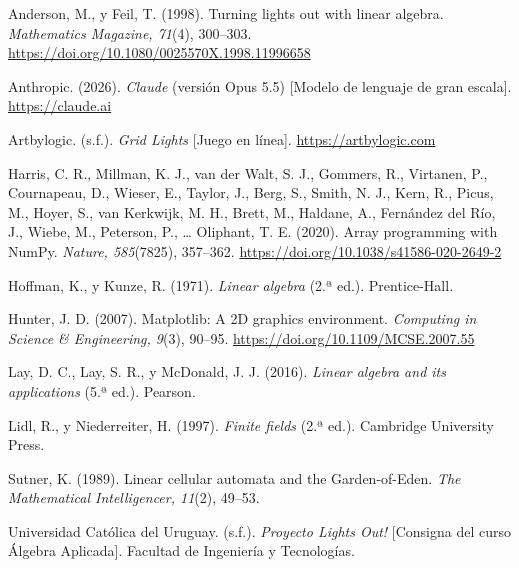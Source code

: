 \documentclass[12pt,a4paper]{article}
\theoremstyle{plain}
\theoremstyle{definition}
\theoremstyle{remark}
\begin{document}
\begingroup
\setlength{\parindent}{-1.27cm}
\setlength{\leftskip}{1.27cm}
\setlength{\parskip}{0.5em}

Anderson, M., y Feil, T. (1998). Turning lights out with linear algebra. \textit{Mathematics Magazine, 71}(4), 300--303. \url{https://doi.org/10.1080/0025570X.1998.11996658}

Anthropic. (2026). \textit{Claude} (versión Opus 5.5) [Modelo de lenguaje de gran escala]. \url{https://claude.ai}

Artbylogic. (s.f.). \textit{Grid Lights} [Juego en línea]. \url{https://artbylogic.com}

Harris, C. R., Millman, K. J., van der Walt, S. J., Gommers, R., Virtanen, P., Cournapeau, D., Wieser, E., Taylor, J., Berg, S., Smith, N. J., Kern, R., Picus, M., Hoyer, S., van Kerkwijk, M. H., Brett, M., Haldane, A., Fernández del Río, J., Wiebe, M., Peterson, P., \ldots{} Oliphant, T. E. (2020). Array programming with NumPy. \textit{Nature, 585}(7825), 357--362. \url{https://doi.org/10.1038/s41586-020-2649-2}

Hoffman, K., y Kunze, R. (1971). \textit{Linear algebra} (2.ª ed.). Prentice-Hall.

Hunter, J. D. (2007). Matplotlib: A 2D graphics environment. \textit{Computing in Science \& Engineering, 9}(3), 90--95. \url{https://doi.org/10.1109/MCSE.2007.55}

Lay, D. C., Lay, S. R., y McDonald, J. J. (2016). \textit{Linear algebra and its applications} (5.ª ed.). Pearson.

Lidl, R., y Niederreiter, H. (1997). \textit{Finite fields} (2.ª ed.). Cambridge University Press.

Sutner, K. (1989). Linear cellular automata and the Garden-of-Eden. \textit{The Mathematical Intelligencer, 11}(2), 49--53.

Universidad Católica del Uruguay. (s.f.). \textit{Proyecto Lights Out!} [Consigna del curso Álgebra Aplicada]. Facultad de Ingeniería y Tecnologías.

\endgroup
\end{document}
